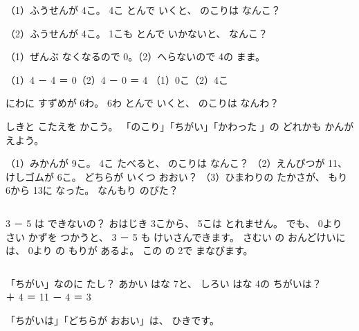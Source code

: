\begin{reidai}[0が でて くる ひき\R{算}{ざん}]
（1）ふうせんが 4こ。 4こ とんで いくと、 のこりは なんこ？\par
（2）ふうせんが 4こ。 1こも とんで いかないと、 なんこ？

\kangaekata （1）ぜんぶ なくなるので 0。（2）へらないので 4の まま。

\shiki （1）4 － 4 ＝ 0\enspace（2）4 － 0 ＝ 4 \kotaenext （1）0こ\enspace（2）4こ
\end{reidai}

\begin{jibun}
にわに すずめが 6わ。 6わ とんで いくと、 のこりは なんわ？
\bkshikiran
{}
\end{jibun}

\begin{jibun}[どの ひき\R{算}{ざん}かな？]
しきと こたえを かこう。 「のこり」「ちがい」「かわった 」の どれかも かんがえよう。\par\vspace{2pt}
（1）みかんが 9こ。 4こ たべると、 のこりは なんこ？
\bkshikiran
（2）えんぴつが 11、 けしゴムが 6こ。 どちらが いくつ おおい？
\bkshikiran[11\zw]
（3）ひまわりの たかさが、 もり 6から 13に なった。 なんもり のびた？
\bkshikiran
{}
\end{jibun}

\begin{column}{3 － 5 は できないの？}
おはじき 3こから、 5こは とれません。 でも、 0より さい かずを つかうと、 3 － 5 も けいさんできます。 さむい の おんどけいには、 0より の もりが あるよ。 この の 2で まなびます。
\end{column}

\clearpage

\begin{tsumazuki}{「ちがい」なのに たし？}
あかい はな 7と、 しろい はな 4の ちがいは？\\
\bkbatsu{} ＋ 4 ＝ 11\hspace{3\zw}\bkmaru{} － 4 ＝ 3\par
「ちがいは」「どちらが おおい」は、 ひきです。
\end{tsumazuki}

